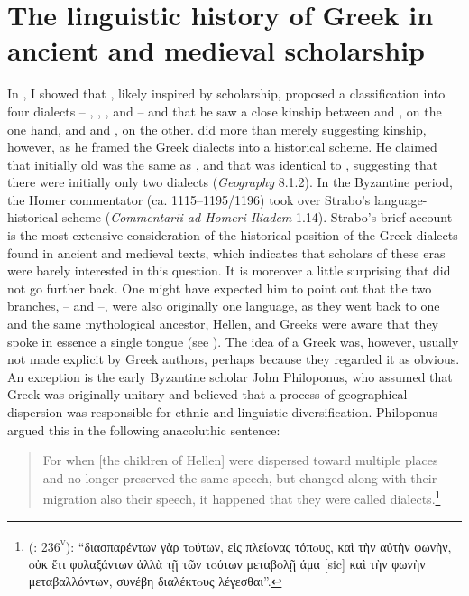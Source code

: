 \section{The linguistic history of Greek in ancient and medieval scholarship}\label{sec:5.1}

In , I showed that , likely inspired by  scholarship, proposed a classification into four dialects – , , , and  – and that he saw a close kinship between  and , on the one hand, and  and , on the other.  did more than merely suggesting kinship, however, as he framed the Greek dialects into a historical scheme. He claimed that initially old  was the same as , and that  was identical to , suggesting that there were initially only two dialects (\textit{Geography} 8.1.2). In the Byzantine period, the Homer commentator  (ca. 1115–1195/1196) took over Strabo’s language-historical scheme (\textit{Commentarii ad Homeri Iliadem} 1.14). Strabo’s brief account is the most extensive consideration of the historical position of the Greek dialects found in ancient and medieval texts, which indicates that scholars of these eras were barely interested in this question. It is moreover a little surprising that  did not go further back. One might have expected him to point out that the two branches, – and –, were also originally one language, as they went back to one and the same mythological ancestor, Hellen, and Greeks were aware that they spoke in essence a single tongue (see \citealt{Morpurgo1987}). The idea of a Greek  was, however, usually not made explicit by Greek authors, perhaps because they regarded it as obvious. An exception is the early Byzantine scholar John Philoponus, who assumed that Greek was originally unitary and believed that a process of geographical dispersion was responsible for ethnic and linguistic diversification. Philoponus argued this in the following anacoluthic sentence:

\begin{quote}
For when [the children of Hellen] were dispersed toward multiple places and no longer preserved the same speech, but changed along with their migration also their speech, it happened that they were called dialects.\footnote{ (\citealt{Manutius1496Thesaurus}: 236\textsc{\textsuperscript{v}}): “διασπαρέντων γὰρ τoύτων, εἰς πλείoνας τόπoυς, καὶ τὴν αὐτὴν φωνὴν, oὐκ ἔτι φυλαξάντων\text{\textgreek{;}} ἀλλὰ τῇ τῶν τoύτων μεταβoλῇ άμα [sic] καὶ τὴν φωνὴν μεταβαλλόντων, συνέβη διαλέκτoυς λέγεσθαι”.}
\end{quote}

